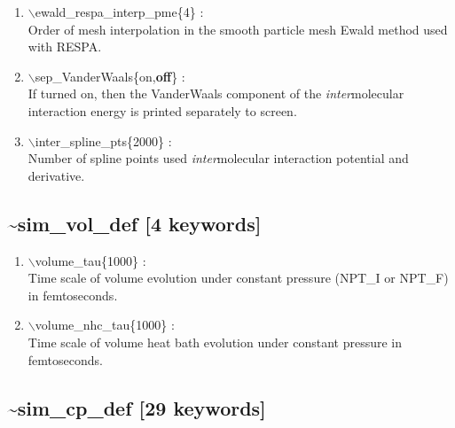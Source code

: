 \documentclass[12pt]{article}
\begin{document}
\begin{enumerate}
 \vspace{0.15in} 
 \item   $\backslash$ewald\_respa\_interp\_pme\{4\} : \\
  Order of mesh interpolation in the smooth particle mesh Ewald method used
  with RESPA.

 \vspace{0.15in}
 \item   $\backslash$sep\_VanderWaals\{on,{\bf off}\} : \\
   If turned on, then the VanderWaals component of the {\it inter}molecular 
   interaction energy is printed separately to screen.

 \vspace{0.15in} 
 \item   $\backslash$inter\_spline\_pts\{2000\} : \\
    Number of spline points used {\it inter}molecular interaction 
    potential and derivative.

\end{enumerate}

\newpage
\subsection*{\bf \~{}sim\_vol\_def [4 keywords]}

\begin{enumerate}

 \vspace{0.15in} 
 \item  $\backslash$volume\_tau\{1000\} : \\
     Time scale of volume evolution
     under constant pressure (NPT\_I or NPT\_F) in femtoseconds.
  
 \vspace{0.15in} 
 \item  $\backslash$volume\_nhc\_tau\{1000\} : \\
     Time scale of volume 
     heat bath evolution under constant pressure in femtoseconds.

\end{enumerate}

\newpage
\subsection*{\bf \~{}sim\_cp\_def [29 keywords]}
\end{document}
